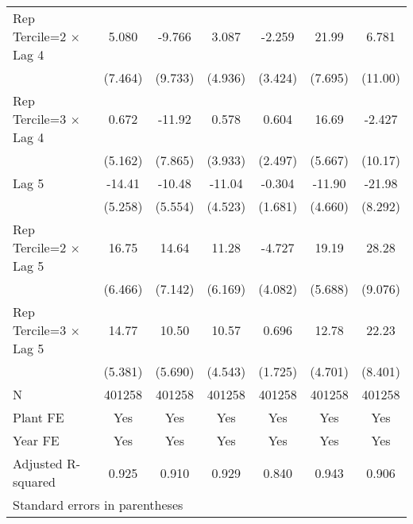 \begin{table}[htbp]
\begin{tabular}{l*{6}{c}}
\addlinespace
Rep Tercile=2 $\times$ Lag 4&    5.080         &   -9.766         &    3.087         &   -2.259         &    21.99\sym{**} &    6.781         \\
                &  (7.464)         &  (9.733)         &  (4.936)         &  (3.424)         &  (7.695)         &  (11.00)         \\
\addlinespace
Rep Tercile=3 $\times$ Lag 4&    0.672         &   -11.92         &    0.578         &    0.604         &    16.69\sym{**} &   -2.427         \\
                &  (5.162)         &  (7.865)         &  (3.933)         &  (2.497)         &  (5.667)         &  (10.17)         \\
\addlinespace
Lag 5           &   -14.41\sym{**} &   -10.48         &   -11.04\sym{*}  &   -0.304         &   -11.90\sym{*}  &   -21.98\sym{**} \\
                &  (5.258)         &  (5.554)         &  (4.523)         &  (1.681)         &  (4.660)         &  (8.292)         \\
\addlinespace
Rep Tercile=2 $\times$ Lag 5&    16.75\sym{**} &    14.64\sym{*}  &    11.28         &   -4.727         &    19.19\sym{***}&    28.28\sym{**} \\
                &  (6.466)         &  (7.142)         &  (6.169)         &  (4.082)         &  (5.688)         &  (9.076)         \\
\addlinespace
Rep Tercile=3 $\times$ Lag 5&    14.77\sym{**} &    10.50         &    10.57\sym{*}  &    0.696         &    12.78\sym{**} &    22.23\sym{**} \\
                &  (5.381)         &  (5.690)         &  (4.543)         &  (1.725)         &  (4.701)         &  (8.401)         \\
\midrule
N               &   401258         &   401258         &   401258         &   401258         &   401258         &   401258         \\
Plant FE        &      Yes         &      Yes         &      Yes         &      Yes         &      Yes         &      Yes         \\
Year FE         &      Yes         &      Yes         &      Yes         &      Yes         &      Yes         &      Yes         \\
Adjusted R-squared&    0.925         &    0.910         &    0.929         &    0.840         &    0.943         &    0.906         \\
\bottomrule
\multicolumn{7}{l}{\footnotesize Standard errors in parentheses}\\

\end{tabular}
\end{table}
